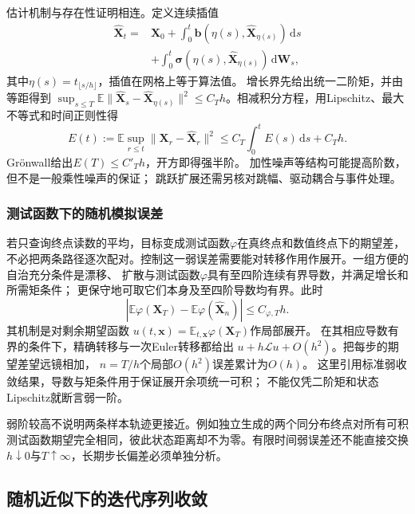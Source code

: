 估计机制与存在性证明相连。定义连续插值
\[
 \begin{split}
 \widehat{\bm X}_t={}&\bm X_0+
    \int_0^t\bm b(\eta(s),\widehat{\bm X}_{\eta(s)})\,\mathrm ds\\
 &+\int_0^t\bm\sigma(\eta(s),\widehat{\bm X}_{\eta(s)})\,\mathrm d\bm W_s,
 \end{split}
\]
其中$\eta(s)=t_{\lfloor s/h\rfloor}$，插值在网格上等于算法值。
增长界先给出统一二阶矩，并由等距得到
$\sup_{s\leq T}\mathbb E\|\widehat{\bm X}_s-\widehat{\bm X}_{\eta(s)}\|^2
\leq C_T h$。相减积分方程，用Lipschitz、最大不等式和时间正则性得
\[
 E(t):=\mathbb E\sup_{r\leq t}\|\bm X_r-\widehat{\bm X}_r\|^2
       \leq C_T\int_0^tE(s)\,\mathrm ds+C_T h.
\]
Grönwall给出$E(T)\leq C'_T h$，开方即得强半阶。
加性噪声等结构可能提高阶数，但不是一般乘性噪声的保证；
跳跃扩展还需另核对跳幅、驱动耦合与事件处理。

\subsubsection{测试函数下的随机模拟误差}
若只查询终点读数的平均，目标变成测试函数$\varphi$在真终点和数值终点下的期望差，不必把两条路径逐次配对。控制这一弱误差需要能对转移作用作展开。一组方便的自治充分条件是漂移、
扩散与测试函数$\varphi$具有至四阶连续有界导数，并满足增长和所需矩条件；
更保守地可取它们本身及至四阶导数均有界。此时
\[
  |\mathbb E\varphi(\bm X_T)-\mathbb E\varphi(\widehat{\bm X}_n)|
        \leq C_{\varphi,T}h.
\]
其机制是对剩余期望函数
$u(t,\bm x)=\mathbb E_{t,\bm x}\varphi(\bm X_T)$作局部展开。
在其相应导数有界的条件下，精确转移与一次Euler转移都给出
$u+h\mathcal L u+O(h^2)$。把每步的期望差望远镜相加，
$n=T/h$个局部$O(h^2)$误差累计为$O(h)$。
这里引用标准弱收敛结果，导数与矩条件用于保证展开余项统一可积；
不能仅凭二阶矩和状态Lipschitz就断言弱一阶。

弱阶较高不说明两条样本轨迹更接近。例如独立生成的两个同分布终点对所有可积
测试函数期望完全相同，彼此状态距离却不为零。有限时间弱误差还不能直接交换
$h\downarrow0$与$T\uparrow\infty$，长期步长偏差必须单独分析。

\subsection{随机近似下的迭代序列收敛}
\label{sec:stoch-approximation-markov-noise}

